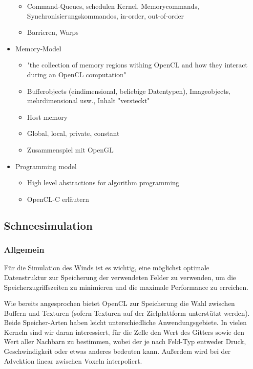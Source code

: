 \begin{itemize}
\begin{itemize}
		\item Command-Queues, schedulen Kernel, Memorycommands, Synchronisierungskommandos, in-order, out-of-order
		\item Barrieren, Warps
	\end{itemize}
\item Memory-Model
	\begin{itemize}
		\item "the collection of memory regions withing OpenCL and how they interact during an OpenCL computation"
		\item Bufferobjects (eindimensional, beliebige Datentypen), Imageobjects, mehrdimensional usw., Inhalt "versteckt"
		\item Host memory
		\item Global, local, private, constant
		\item Zusammenspiel mit OpenGL
	\end{itemize}
\item Programming model
\begin{itemize}
	\item High level abstractions for algorithm programming
	\item OpenCL-C erläutern
\end{itemize}
\end{itemize}

\subsection{Schneesimulation}

\subsubsection{Allgemein}

Für die Simulation des Winds ist es wichtig, eine möglichst optimale
Datenstruktur zur Speicherung der verwendeten Felder zu verwenden, um
die Speicherzugriffszeiten zu minimieren und die maximale Performance zu
erreichen.

Wie bereits angesprochen bietet OpenCL zur Speicherung die Wahl zwischen Buffern
und Texturen (sofern Texturen auf der Zielplattform unterstützt werden). Beide
Speicher-Arten haben leicht unterschiedliche Anwendungsgebiete. In vielen
Kerneln sind wir daran interessiert, für die  Zelle den
Wert des Gitters sowie den Wert aller Nachbarn zu bestimmen, wobei der
 je nach Feld-Typ entweder Druck, Geschwindigkeit oder etwas
anderes bedeuten kann. Außerdem wird bei der Advektion linear zwischen Voxeln
interpoliert.

